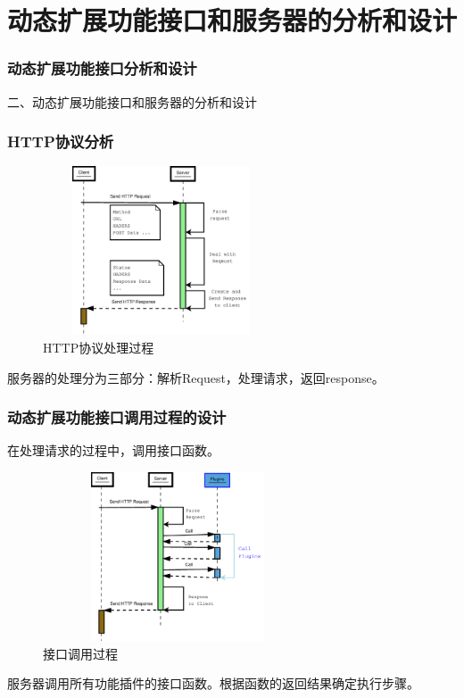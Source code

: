 \documentclass[10pt,dvipdfm]{beamer}
\begin{document}
\section{动态扩展功能接口和服务器的分析和设计}



\begin{frame}
	\frametitle{动态扩展功能接口分析和设计}
	\begin{center}
	{\Large
		二、动态扩展功能接口和服务器的分析和设计
	}
	\end{center}
\end{frame}


\begin{frame}
	\frametitle{HTTP协议分析}
	\begin{figure}[htbp]
	\centering
	\includegraphics[height=5cm, width=7cm]{pics/serverhttp.eps}
	\caption{HTTP协议处理过程}
	\end{figure}
	服务器的处理分为三部分：解析Request，处理请求，返回response。
\end{frame}

\begin{frame}
	\frametitle{动态扩展功能接口调用过程的设计}
	在处理请求的过程中，调用接口函数。
	\begin{figure}[htbp]
	\centering
	\includegraphics[height=5cm, width=8cm]{pics/httpplugin.eps}
	\caption{接口调用过程}
	\end{figure}
	服务器调用所有功能插件的接口函数。根据函数的返回结果确定执行步骤。
	
\end{frame}
\end{document}
